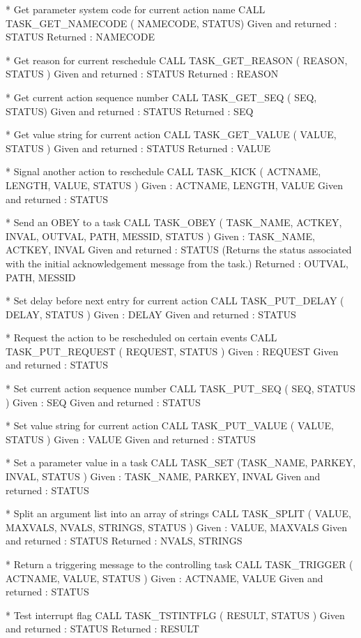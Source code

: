 \documentclass[twoside,11pt,nolof]{starlink}
\begin{document}
\begin{terminalv}
*  Get parameter system code for current action name
CALL TASK_GET_NAMECODE ( NAMECODE, STATUS)
Given and returned : STATUS
Returned : NAMECODE

*  Get reason for current reschedule
CALL TASK_GET_REASON ( REASON, STATUS )
Given and returned : STATUS
Returned : REASON

*  Get current action sequence number
CALL TASK_GET_SEQ ( SEQ, STATUS)
Given and returned : STATUS
Returned : SEQ

*  Get value string for current action
CALL TASK_GET_VALUE ( VALUE, STATUS )
Given and returned : STATUS
Returned : VALUE

*  Signal another action to reschedule
CALL TASK_KICK ( ACTNAME, LENGTH, VALUE, STATUS )
Given : ACTNAME, LENGTH, VALUE
Given and returned : STATUS

*  Send an OBEY to a task
CALL TASK_OBEY ( TASK_NAME, ACTKEY, INVAL, OUTVAL, PATH, MESSID, STATUS )
Given : TASK_NAME, ACTKEY, INVAL
Given and returned : STATUS (Returns the status associated with the initial
                     acknowledgement message from the task.)
Returned : OUTVAL, PATH, MESSID

*  Set delay before next entry for current action
CALL TASK_PUT_DELAY ( DELAY, STATUS )
Given : DELAY
Given and returned : STATUS

*  Request the action to be rescheduled on certain events
CALL TASK_PUT_REQUEST ( REQUEST, STATUS )
Given : REQUEST
Given and returned : STATUS

*  Set current action sequence number
CALL TASK_PUT_SEQ ( SEQ, STATUS )
Given : SEQ
Given and returned : STATUS
\end{terminalv}
\newpage
\begin{terminalv}
*  Set value string for current action
CALL TASK_PUT_VALUE ( VALUE, STATUS )
Given : VALUE
Given and returned : STATUS

*  Set a parameter value in a task
CALL TASK_SET (TASK_NAME, PARKEY, INVAL, STATUS )
Given : TASK_NAME, PARKEY, INVAL
Given and returned : STATUS

*  Split an argument list into an array of strings
CALL TASK_SPLIT ( VALUE, MAXVALS, NVALS, STRINGS, STATUS )
Given : VALUE, MAXVALS
Given and returned : STATUS
Returned : NVALS, STRINGS

*  Return a triggering message to the controlling task
CALL TASK_TRIGGER ( ACTNAME, VALUE, STATUS )
Given : ACTNAME, VALUE
Given and returned : STATUS

*  Test interrupt flag
CALL TASK_TSTINTFLG ( RESULT, STATUS )
Given and returned : STATUS
Returned : RESULT
\end{terminalv}
\end{document}
